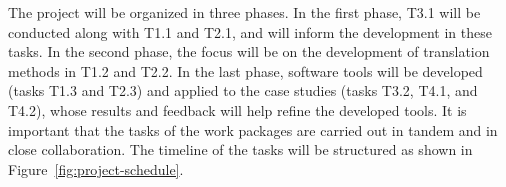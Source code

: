 %
The project will be organized in three phases.
In the first phase, T3.1 will be conducted along with T1.1 and T2.1, and will inform the development in these tasks.
In the second phase, the focus will be on the development of translation methods in T1.2 and T2.2.
In the last phase, software tools will be developed (tasks T1.3 and T2.3) and applied to the case studies (tasks T3.2, T4.1, and T4.2), whose results and feedback will help refine the developed tools.
It is important that the tasks of the work packages are carried out in tandem and in close collaboration.
The timeline of the tasks will be structured as shown in Figure~\ref{fig:project-schedule}.

